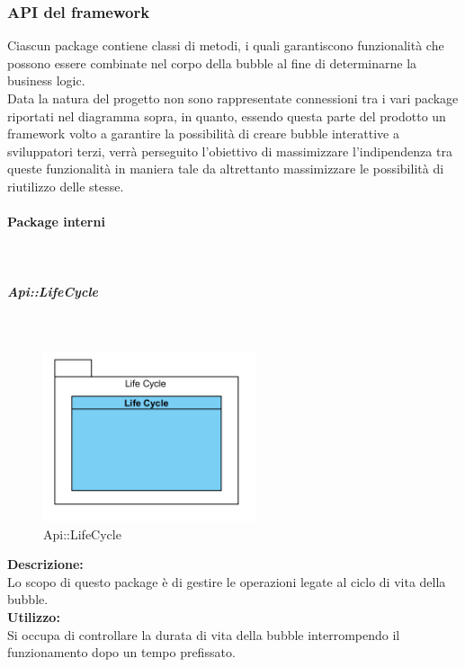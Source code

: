 \subsubsection{API del framework}
Ciascun package contiene classi di metodi, i quali garantiscono funzionalità che possono essere combinate nel corpo della bubble al fine di determinarne la business logic.\\
Data la natura del progetto non sono rappresentate connessioni tra i vari package riportati nel diagramma sopra, in quanto, essendo questa parte del prodotto un framework volto a garantire la possibilità di creare bubble interattive a sviluppatori terzi, verrà perseguito l'obiettivo di massimizzare l'indipendenza tra queste funzionalità in maniera tale da altrettanto massimizzare le possibilità di riutilizzo delle stesse.

\paragraph{Package interni}\mbox{}\\

\begin{samepage}
\subparagraph{Api\-::Life\-Cycle}\label{api-ciclovita}\mbox{}\\
\nopagebreak
\begin{figure}[H]
	\centering
	\includegraphics[height=5cm]{diagrammi_img/classi_e_package/api_vitabolla.png}
	\caption{Api\-::Life\-Cycle}
\end{figure}
\end{samepage}
\textbf{Descrizione:}\\ 
Lo scopo di questo package è di gestire le operazioni legate al ciclo di vita della bubble.\\
\textbf{Utilizzo:}\\
Si occupa di controllare la durata di vita della bubble interrompendo il funzionamento dopo un tempo prefissato.\\

